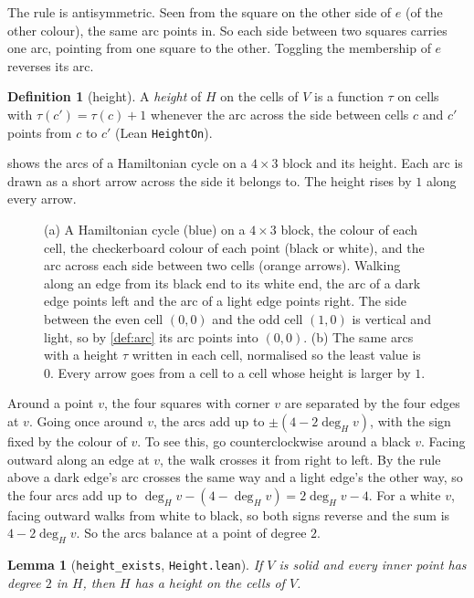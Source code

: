 \documentclass[11pt]{article}
\theoremstyle{plain}
\newtheorem{lemma}[theorem]{Lemma}
\theoremstyle{definition}
\newtheorem{definition}[theorem]{Definition}
\theoremstyle{remark}
\newcommand{\lean}[1]{\texttt{#1}}
\begin{document}
The rule is antisymmetric.
Seen from the square on the other side of $e$ (of the other colour), the same arc points in.
So each side between two squares carries one arc, pointing from one square to the other.
Toggling the membership of $e$ reverses its arc.

\begin{definition}[height]
A \emph{height} of $H$ on the cells of $V$ is a function $\tau$ on cells with
$\tau(c')=\tau(c)+1$ whenever the arc across the side between cells $c$ and $c'$ points from $c$
to $c'$ (Lean \lean{HeightOn}).
\end{definition}

 shows the arcs of a Hamiltonian cycle on a $4\times3$ block and its height.
Each arc is drawn as a short arrow across the side it belongs to.
The height rises by $1$ along every arrow.

\begin{figure}[t]
\centering

\caption{(a) A Hamiltonian cycle (blue) on a $4\times3$ block, the colour of each cell, the checkerboard
colour of each point (black or white), and the arc across each side between two cells (orange
arrows).
Walking along an edge from its black end to its white end, the arc of a dark edge points left and
the arc of a light edge points right.
The side between the even cell $(0,0)$ and the odd cell $(1,0)$ is vertical and light, so by
\cref{def:arc} its arc points into $(0,0)$.
(b) The same arcs with a height $\tau$ written in each cell, normalised so the least value is $0$.
Every arrow goes from a cell to a cell whose height is larger by $1$.}
\label{fig:arcs}
\end{figure}

Around a point $v$, the four squares with corner $v$ are separated by the four edges at $v$.
Going once around $v$, the arcs add up to $\pm(4-2\deg_H v)$, with the sign fixed by the colour of
$v$.
To see this, go counterclockwise around a black $v$.
Facing outward along an edge at $v$, the walk crosses it from right to left.
By the rule above a dark edge's arc crosses the same way and a light edge's the other way, so the
four arcs add up to $\deg_H v-(4-\deg_H v)=2\deg_H v-4$.
For a white $v$, facing outward walks from white to black, so both signs reverse and the sum is
$4-2\deg_H v$.
So the arcs balance at a point of degree $2$.

\begin{lemma}[\lean{height\_exists}, \lean{Height.lean}]
\label{lem:height}
If $V$ is solid and every inner point has degree $2$ in $H$, then $H$ has a height on the cells
of $V$.
\end{lemma}
\end{document}

